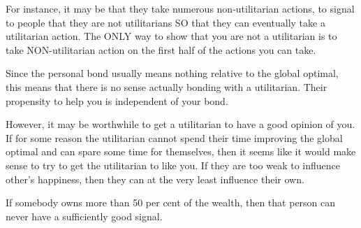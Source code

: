 \documentclass[11pt]{article}
\numberwithin{equation}{section}
\begin{document}
For instance, it may be that they take numerous non-utilitarian actions, to signal to people that they are not utilitarians SO that they can eventually take a utilitarian action. The ONLY way to show that you are not a utilitarian is to take NON-utilitarian action on the first half of the actions you can take.

Since the personal bond usually means nothing relative to the global optimal, this means that there is no sense actually bonding with a utilitarian. Their propensity to help you is independent of your bond.

However, it may be worthwhile to get a utilitarian to have a good opinion of you. If for some reason the utilitarian cannot spend their time improving the global optimal and can spare some time for themselves, then it seems like it would make sense to try to get the utilitarian to like you. If they are too weak to influence other’s happiness, then they can at the very least influence their own.

If somebody owns more than 50 per cent of the wealth, then that person can never have a sufficiently good signal.

\newpage




\clearpage

\appendix

\end{document}
